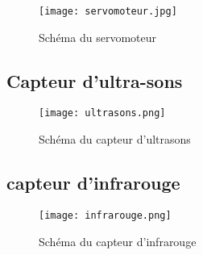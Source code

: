 \documentclass[12pt, openany]{report}
\begin{document}
     \begin{figure}[!h]
                     \centering
    \texttt{[image: servomoteur.jpg]} 
              \caption{Schéma du servomoteur}
                    		          		
     \end{figure}    									\subsection{Capteur d'ultra-sons}
     	
      \begin{figure}[!h]
                          \centering
         \texttt{[image: ultrasons.png]} 
                   \caption{Schéma du capteur d'ultrasons}
                         		          		
          \end{figure}
    \subsection{ capteur d'infrarouge}
           \begin{figure}[!h]
                                    \centering
                   \texttt{[image: infrarouge.png]} 
                             \caption{Schéma du capteur  d'infrarouge}
                                   		          		
                    \end{figure} 	
\end{document}
